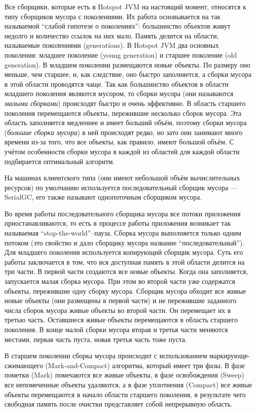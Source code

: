 Все сборщики, которые есть в Hotspot JVM на настоящий момент, относятся к типу сборщиков мусора
с поколениями. Их работа основывается на так называемой ``слабой гипотезе о поколениях'':
большинство объектов живут недолго и количество ссылок на них мало. Память делится на области, называемые
поколениями (generations). В Hotspot JVM два основных поколения: младшее поколение (young generation)
и старшее поколение (old generation). В младшем поколении размещаются новые объекты. По размеру оно меньше, чем 
старшее, и, как следствие, оно быстро заполняется, а сборки мусора в этой
области проводятся чаще. Так как большинство объектов в области младшего поколения
являются мусором, то сборки мусора (они называются \emph{малыми сборками}) происходят быстро и очень 
эффективно. В область старшего поколения перемещаются объекты, пережившие несколько сборок мусора. 
Эта область заполняется медленнее и имеет больший объём, поэтому сборки мусора (\emph{большие сборки мусора}) в 
ней происходят редко, но зато они занимают много времени из-за того, что все объекты, как правило, 
имеют большой объём. С учётом особенности сборки мусора в каждой из областей  для каждой области подбирается оптимальный алгоритм.

На машинах клиентского типа (они имеют небольшой объём вычислительных ресурсов) по
умолчанию используется последовательный сборщик мусора --- SerialGC, его также 
называют однопоточным сборщиком мусора. 

Во время работы последовательного сборщика мусора все потоки приложения приостанавливаются, то есть в 
процессе работы приложения возникает так называемая ``stop-the-world''--пауза. Сборка мусора выполняется только 
одним потоком (это свойство и дало сборщику мусора название ``последовательный'').
Для младшего поколения используется копирующий сборщик мусора. Суть его работы заключается
в том, что вся доступная память в этой области делится на три части.
В первой части создаются все новые объекты. Когда она заполняется,
запускается малая сборка мусора. При этом во второй части уже содержатся объекты, пережившие
одну сборку мусора. Сборщик мусора обходит все живые новые объекты (они размещены в первой части) и не 
пережившие заданного числа сборок мусора живые объекты во второй части. Он перемещает их в третью часть.
Оставшиеся живые объекты перемещаются в область старшего поколения. В конце малой сборки мусора
вторая и третья части меняются местами, первая часть пуста, новая третья часть тоже пуста. 

В старшем поколении сборка мусора происходит с использованием маркирующе-сжимающего
(Mark-and-Compact) алгоритма, который имеет три фазы. В фазе пометки (Mark) помечаются
все живые объекты, в фазе освобождения (Sweep) все непомеченные объекты удаляются, 
а в фазе уплотнения (Compact) все живые объекты перемещаются в начало области старшего поколения, 
в результате чего свободная память после очистки представляет собой непрерывную область. 

